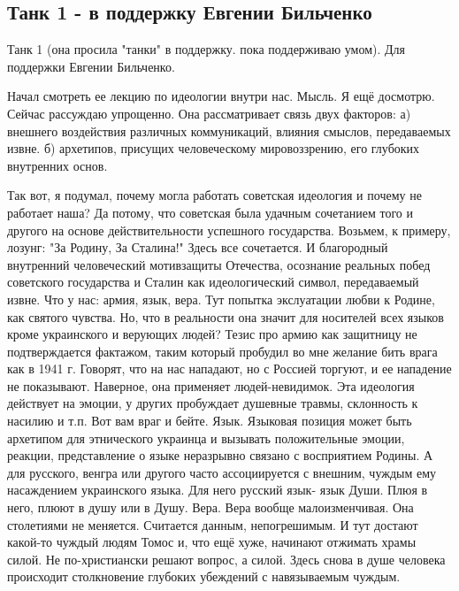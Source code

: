  
 
 
 
 
\subsection{Танк 1 - в поддержку Евгении Бильченко}
\label{sec:14_04_2021.fb.nikonov_sergej.1.tank_bilchenko_idea}

Танк 1 (она просила "танки" в поддержку. пока поддерживаю умом). Для  поддержки
Евгении Бильченко. 

Начал смотреть ее лекцию по идеологии внутри нас. Мысль. Я ещё досмотрю. Сейчас
рассуждаю упрощенно. Она рассматривает связь двух факторов: а) внешнего
воздействия различных коммуникаций, влияния смыслов, передаваемых извне. б)
архетипов, присущих человеческому мировоззрению, его глубоких внутренних основ.

Так вот, я подумал, почему могла работать советская идеология  и почему не
работает наша? Да потому, что советская была удачным сочетанием того и другого
на основе действительности успешного государства. Возьмем, к примеру, лозунг:
"За Родину, За Сталина!" Здесь все сочетается. И благородный внутренний
человеческий мотивзащиты Отечества, осознание реальных побед советского
государства и Сталин как идеологический символ, передаваемый извне. Что  у нас:
армия, язык, вера. Тут попытка экслуатации любви к Родине, как святого чувства.
Но, что в реальности она значит для носителей всех языков кроме украинского и
верующих людей? Тезис про армию как защитницу не подтверждается фактажом, таким
который пробудил во мне желание бить врага как в 1941 г. Говорят, что на нас
нападают, но с Россией торгуют, и ее нападение не показывают. Наверное, она
применяет людей-невидимок.  Эта идеология действует на эмоции, у других
пробуждает душевные травмы, склонность к насилию и т.п. Вот вам враг и бейте.
Язык. Языковая позиция может быть архетипом для этнического украинца и вызывать
положительные эмоции, реакции, представление о языке неразрывно связано с
восприятием Родины. А для русского, венгра или другого часто  ассоциируется с
внешним, чуждым ему насаждением украинского языка. Для него русский язык- язык
Души. Плюя в него, плюют в душу или в Душу.   Вера. Вера вообще малоизменчивая.
Она столетиями не меняется. Считается данным, непогрешимым. И тут достают
какой-то чуждый людям Томос и, что ещё хуже, начинают отжимать храмы силой. Не
по-христиански решают вопрос, а силой. Здесь снова в душе человека происходит
столкновение глубоких убеждений с навязываемым чуждым.
